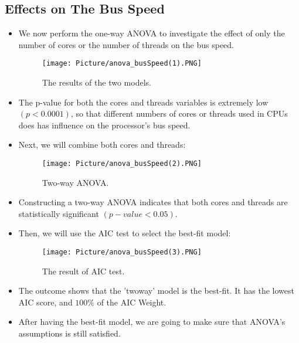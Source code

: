 \documentclass[a4paper]{article}
\begin{document}
\subsection{Effects on The Bus Speed}
\begin{itemize}
    \item[] We now perform the one-way ANOVA to investigate the effect of only the number of cores or the number of threads on the bus speed.
    
    \begin{figure}[H]
        \centering
        \texttt{[image: Picture/anova\_busSpeed(1).PNG]}
        \caption{The results of the two models.}
        \label{7.4.1}
    \end{figure}
    
    \item[] The p-value for both the cores and threads variables is extremely low $(p < 0.0001)$, so that different numbers of cores or threads used in CPUs does has influence on the processor's bus speed.
    
    \item[] Next, we will combine both cores and threads:
    
    \begin{figure}[H]
        \centering
        \texttt{[image: Picture/anova\_busSpeed(2).PNG]}
        \caption{Two-way ANOVA.}
        \label{7.4.2}
    \end{figure}
    
    \item[] Constructing a two-way ANOVA indicates that both cores and threads are statistically significant $(p-value < 0.05)$.
    
    \item[] Then, we will use the AIC test to select the best-fit model:
    
    \begin{figure}[H]
        \centering
        \texttt{[image: Picture/anova\_busSpeed(3).PNG]}
        \caption{The result of AIC test.}
        \label{7.4.3}
    \end{figure}
    
    \item[]The outcome shows that the 'twoway' model is the best-fit. It has the lowest AIC score, and $100 \%$ of the AIC Weight.
    
    \item[] After having the best-fit model, we are going to make sure that ANOVA's assumptions is still satisfied.
    

\end{itemize}
\end{document}
